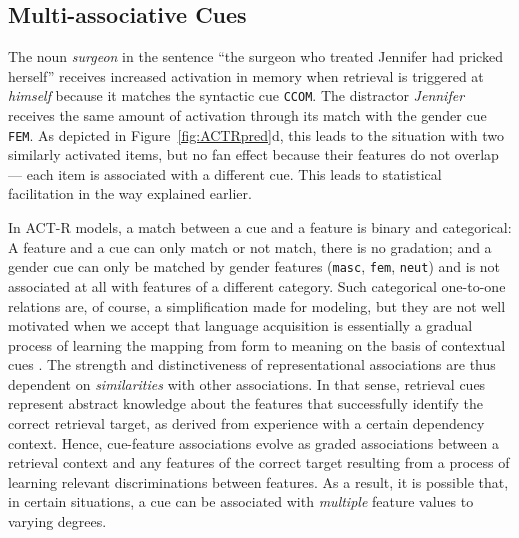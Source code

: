 \documentclass{cambridge7A}\usepackage[]{graphicx}\usepackage[]{color}
\newcommand{\actrcue}[1]{\texttt{\uppercase{#1}}}
\newcommand{\revFE}[1]{#1}
\begin{document}
\subsection{Multi-associative Cues}
\label{sec:cueconf}
\revFE{
The noun \textit{surgeon} in the sentence ``the surgeon who treated Jennifer had pricked herself'' receives increased activation in memory when retrieval is triggered at \textit{himself} because it matches the syntactic cue \actrcue{CCOM}.
The distractor \textit{Jennifer} receives the same amount of activation through its match with the gender cue \actrcue{FEM}. As depicted in Figure~\ref{fig:ACTRpred}d, this leads to the situation with two similarly activated items, but no fan effect because their features do not overlap --- each item is associated with a different cue.
This leads to statistical facilitation in the way explained earlier.

In ACT-R models, a match between a cue and a feature is binary and categorical: A feature and a cue can only match or not match, there is no gradation; and a gender cue can only be matched by gender features (\texttt{masc}, \texttt{fem}, \texttt{neut}) and is not associated at all with features of a different category.
Such categorical one-to-one relations are, of course, a simplification made for modeling, but they are not well motivated when we accept that language acquisition is essentially a gradual process of learning the mapping from form to meaning on the basis of contextual cues \citep[see, e.g.,][]{bybee2006usage,langacker1987foundations,tomasello2003constructing}. The strength and distinctiveness of representational associations are thus dependent on \emph{similarities} with other associations.
In that sense, retrieval cues represent abstract knowledge about the features that successfully identify the correct retrieval target, as derived from experience with a certain dependency context. Hence, cue-feature associations evolve as graded associations between a retrieval context and any features of the correct target resulting from a process of learning relevant discriminations between features. 
As a result, it is possible that, in certain situations, a cue can be associated with \emph{multiple} feature values to varying degrees. 

}
\end{document}
